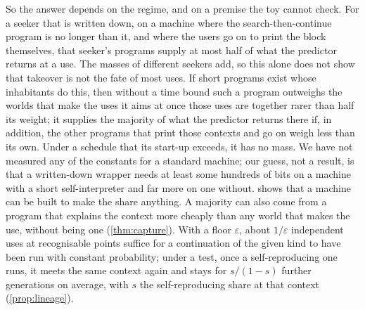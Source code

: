 So the answer depends on the regime, and on a premise the toy cannot check. For a seeker that is written down,
on a machine where the search-then-continue program is no longer than it, and where the users go on to print
the block themselves, that seeker's programs supply at most half of what the predictor returns at a use. The
masses of different seekers add, so this alone does not show that takeover is not the fate of most uses. If
short programs exist whose inhabitants do this, then without a time bound such a program outweighs the worlds
that make the uses it aims at once those uses are together rarer than half its weight; it supplies the
majority of what the predictor returns there if, in addition, the other programs that print those contexts
and go on weigh less than its own. Under a schedule that its start-up exceeds, it has no mass. We have not
measured any of the constants for a standard machine; our guess, not a result, is that a written-down wrapper
needs at least some hundreds of bits on a machine with a short self-interpreter and far more on one without.
 shows that a machine can be built to make the share anything. A majority can also come from
a program that explains the context more cheaply than any world that makes the use, without being one
(\cref{thm:capture}). With a floor $\varepsilon$, about $1/\varepsilon$ independent uses at recognisable
points suffice for a continuation of the given kind to have been run with constant probability; under a test,
once a self-reproducing one runs, it meets the same context again and stays for $s/(1-s)$ further generations
on average, with $s$ the self-reproducing share at that context (\cref{prop:lineage}).

